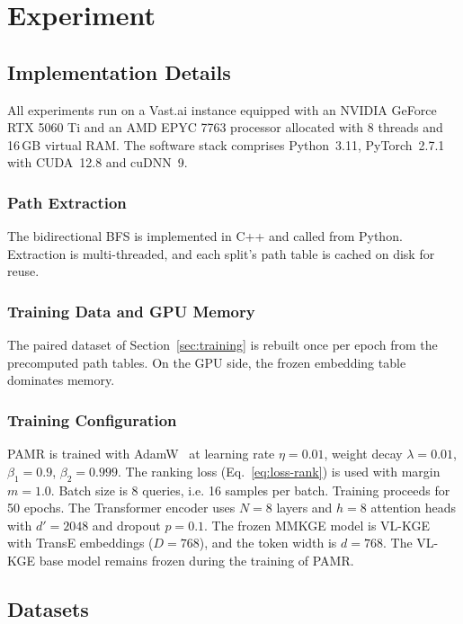 \documentclass[runningheads]{llncs}
\begin{document}
\section{Experiment}
\label{sec:experiment}
\subsection{Implementation Details}
\label{sec:implementation}

All experiments run on a Vast.ai instance equipped with an NVIDIA
GeForce RTX 5060 Ti and an AMD EPYC 7763 processor allocated with 8 threads
and 16\,GB virtual RAM. The software stack comprises Python~3.11,
PyTorch~2.7.1 with CUDA~12.8 and cuDNN~9.

\subsubsection{Path Extraction}
The bidirectional BFS is implemented in C++ and called from Python.
Extraction is multi-threaded, and each split's path table is cached on
disk for reuse.

\subsubsection{Training Data and GPU Memory}
The paired dataset of Section~\ref{sec:training} is rebuilt once per epoch
from the precomputed path tables. On the GPU side, the frozen embedding
table dominates memory.

\subsubsection{Training Configuration}
PAMR is trained with AdamW~\cite{loshchilov2019decoupled} at learning
rate $\eta = 0.01$, weight decay $\lambda = 0.01$, $\beta_1 = 0.9$,
$\beta_2 = 0.999$. The ranking loss (Eq.~\ref{eq:loss-rank}) is
used with margin $m = 1.0$. Batch size is 8 queries, i.e. 16 samples
per batch. Training proceeds for 50 epochs. The Transformer encoder uses
$N = 8$ layers and $h = 8$ attention heads with
$d' = 2048$ and dropout $p = 0.1$. The frozen MMKGE model is
VL-KGE~\cite{efthymiou2026vlkge} with TransE embeddings ($D = 768$), and
the token width is $d = 768$. The VL-KGE base model remains frozen
during the training of PAMR.

\subsection{Datasets}
\label{sec:datasets}
\end{document}
